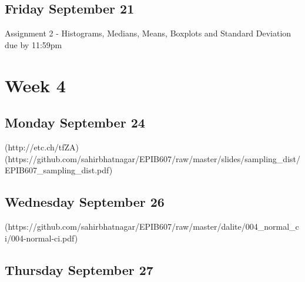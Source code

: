 \documentclass[]{book}
\let\originaltabular\tabular
\let\endoriginaltabular\endtabular
\renewenvironment{tabular}[1]{%
  \begingroup%
  \centering%
  \originaltabular{#1}}%
  {\endoriginaltabular\endgroup}
\theoremstyle{definition}
\theoremstyle{definition}
\theoremstyle{definition}
\theoremstyle{remark}
\begin{document}
\subsection{Friday September 21}\label{friday-september-21}

\begin{table}[H]
\centering
\begin{tabular}{l}
\hline
Assignment 2 - Histograms, Medians, Means, Boxplots and Standard Deviation due by 11:59pm\\
\hline
\end{tabular}
\end{table}

\section{Week 4}\label{week-4}

\subsection{Monday September 24}\label{monday-september-24}

\begin{table}[H]
\centering
\begin{tabular}{l}
(http://etc.ch/tfZA)\\
(https://github.com/sahirbhatnagar/EPIB607/raw/master/slides/sampling\_dist/EPIB607\_sampling\_dist.pdf)\\
\hline
\end{tabular}
\end{table}

\subsection{Wednesday September 26}\label{wednesday-september-26}

\begin{table}[H]
\centering
\begin{tabular}{l}
(https://github.com/sahirbhatnagar/EPIB607/raw/master/dalite/004\_normal\_ci/004-normal-ci.pdf)\\
\hline
\end{tabular}
\end{table}

\subsection{Thursday September 27}\label{thursday-september-27}
\end{document}
